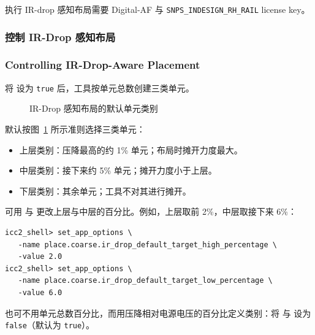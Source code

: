 \begin{noteBox}
执行 IR-drop 感知布局需要 Digital-AF 与 \texttt{SNPS\_INDESIGN\_RH\_RAIL} license key。
\end{noteBox}

\subsubsection{控制 IR-Drop 感知布局}
\subsubsection*{Controlling IR-Drop-Aware Placement}

将  设为 \texttt{true} 后，工具按单元总数创建三类单元。

\begin{figure}[htbp]
\centering
{}
\caption{IR-Drop 感知布局的默认单元类别}
\label{fig:ch2b-ir-drop-categories}
\end{figure}

默认按图~\ref{fig:ch2b-ir-drop-categories} 所示准则选择三类单元：
\begin{itemize}
  \item 上层类别：压降最高的约 1\% 单元；布局时摊开力度最大。
  \item 中层类别：接下来约 5\% 单元；摊开力度小于上层。
  \item 下层类别：其余单元；工具不对其进行摊开。
\end{itemize}

可用  与  更改上层与中层的百分比。例如，上层取前 2\%，中层取接下来 6\%：
\begin{lstlisting}
icc2_shell> set_app_options \
   -name place.coarse.ir_drop_default_target_high_percentage \
   -value 2.0
icc2_shell> set_app_options \
   -name place.coarse.ir_drop_default_target_low_percentage \
   -value 6.0
\end{lstlisting}

也可不用单元总数百分比，而用压降相对电源电压的百分比定义类别：将  与  设为 \texttt{false}（默认为 \texttt{true}）。

